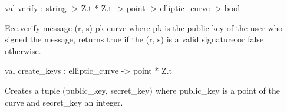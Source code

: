 \documentclass[11pt]{article}
\begin{document}
\begin{ocamldocsigend}
\begin{ocamldocdescription}
\end{ocamldocdescription}


\label{val:Ecc.Ecc.verify}\begin{ocamldoccode}
val verify : string -> Z.t * Z.t -> point -> elliptic_curve -> bool
\end{ocamldoccode}
\begin{ocamldocdescription}
Ecc.verify message (r, s) pk curve where pk is the public key of the user
       who signed the message, returns true if the (r, s) is a valid
       signature or false otherwise.


\end{ocamldocdescription}


\label{val:Ecc.Ecc.create-underscorekeys}\begin{ocamldoccode}
val create_keys : elliptic_curve -> point * Z.t
\end{ocamldoccode}
\begin{ocamldocdescription}
Creates a tuple (public\_key, secret\_key) where public\_key is a point of
       the curve and secret\_key an integer.


\end{ocamldocdescription}
\end{ocamldocsigend}
\end{document}

